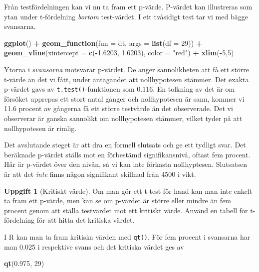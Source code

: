 \documentclass[
]{book}
\newenvironment{Shaded}{\begin{snugshade}}{\end{snugshade}}
\newcommand{\AttributeTok}[1]{\textcolor[rgb]{0.13,0.29,0.53}{#1}}
\newcommand{\DecValTok}[1]{\textcolor[rgb]{0.00,0.00,0.81}{#1}}
\newcommand{\FloatTok}[1]{\textcolor[rgb]{0.00,0.00,0.81}{#1}}
\newcommand{\FunctionTok}[1]{\textcolor[rgb]{0.13,0.29,0.53}{\textbf{#1}}}
\newcommand{\NormalTok}[1]{#1}
\newcommand{\SpecialCharTok}[1]{\textcolor[rgb]{0.81,0.36,0.00}{\textbf{#1}}}
\newcommand{\StringTok}[1]{\textcolor[rgb]{0.31,0.60,0.02}{#1}}
\theoremstyle{definition}
\theoremstyle{definition}
\theoremstyle{definition}
\newtheorem{exercise}{Uppgift}[chapter]
\theoremstyle{definition}
\theoremstyle{remark}
\begin{document}
Från testfördelningen kan vi nu ta fram ett p-värde. P-värdet kan illustreras som ytan under t-fördelning \emph{bortom} test-värdet. I ett tvåsidigt test tar vi med bägge svansarna.

\begin{Shaded}
\begin{Highlighting}[]
\FunctionTok{ggplot}\NormalTok{() }\SpecialCharTok{+}
  \FunctionTok{geom\_function}\NormalTok{(}\AttributeTok{fun =}\NormalTok{ dt, }\AttributeTok{args =} \FunctionTok{list}\NormalTok{(}\AttributeTok{df =} \DecValTok{29}\NormalTok{)) }\SpecialCharTok{+}
  \FunctionTok{geom\_vline}\NormalTok{(}\AttributeTok{xintercept =} \FunctionTok{c}\NormalTok{(}\SpecialCharTok{{-}}\FloatTok{1.6203}\NormalTok{, }\FloatTok{1.6203}\NormalTok{), }
             \AttributeTok{color =} \StringTok{"red"}\NormalTok{) }\SpecialCharTok{+}
  \FunctionTok{xlim}\NormalTok{(}\SpecialCharTok{{-}}\DecValTok{5}\NormalTok{,}\DecValTok{5}\NormalTok{)}
\end{Highlighting}
\end{Shaded}

Ytorna i \emph{svansarna} motsvarar p-värdet. De anger sannolikheten att få ett större t-värde än det vi fått, under antagandet att nollhypotesen stämmer. Det exakta p-värdet gavs av \texttt{t.test()}-funktionen som 0.116. En tolkning av det är om försöket upprepas ett stort antal gånger och nollhypotesen är sann, kommer vi 11.6 procent av gångerna få ett större testvärde än det observerade. Det vi observerar är ganska sannolikt om nollhypotesen stämmer, vilket tyder på att nollhypotesen är rimlig.

Det avslutande steget är att dra en formell slutsats och ge ett tydligt svar. Det beräknade p-värdet ställs mot en förbestämd signifikansnivå, oftast fem procent. Här är p-värdet över den nivån, så vi kan inte förkasta nollhyptesen. Slutsatsen är att det \emph{inte} finns någon signifikant skillnad från 4500 i vikt.

\begin{exercise}[Kritiskt värde]

Om man gör ett t-test för hand kan man inte enkelt ta fram ett p-värde, men kan se om p-värdet är större eller mindre än fem procent genom att ställa testvärdet mot ett kritiskt värde. Använd en tabell för t-fördelning för att hitta det kritiska värdet.

I R kan man ta fram kritiska värden med \texttt{qt()}. För fem procent i svansarna har man 0.025 i respektive svans och det kritiska värdet ges av

\begin{Shaded}
\begin{Highlighting}[]
\FunctionTok{qt}\NormalTok{(}\FloatTok{0.975}\NormalTok{, }\DecValTok{29}\NormalTok{)}
\end{Highlighting}
\end{Shaded}

\end{exercise}
\end{document}
